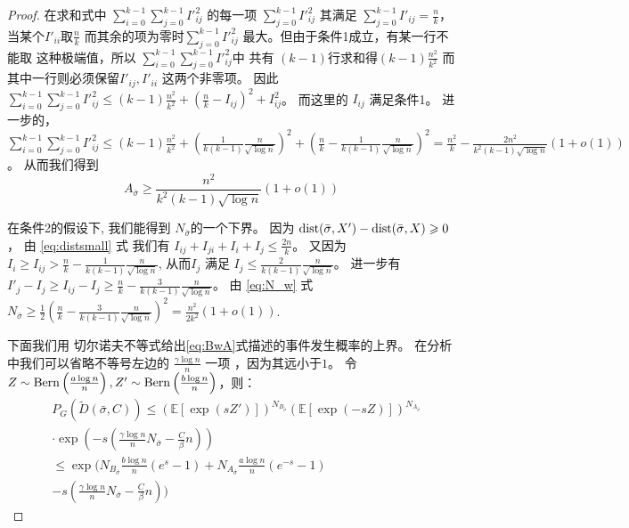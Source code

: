 \begin{proof}
    在求和式中 $\sum_{i=0}^{k-1} \sum_{j=0}^{k-1} I'^2_{ij}$
    的每一项 $\sum_{j=0}^{k-1} I'^2_{ij}$ 其满足 $\sum_{j=0}^{k-1}
    I'_{ij} = \frac{n}{k}$，当某个$I'_{ii}$取$\frac{n}{k}$
    而其余的项为零时$\sum_{j=0}^{k-1} I'^2_{ij}$
    最大。但由于条件1成立，有某一行不能取
    这种极端值，所以 $\sum_{i=0}^{k-1} \sum_{j=0}^{k-1} I'^2_{ij}$中
    共有 $(k-1)$行求和得$ (k-1)\frac{n^2}{k^2}$
    而其中一行则必须保留$I'_{ij}, I'_{ii}$ 这两个非零项。
    因此 $\sum_{i=0}^{k-1} \sum_{j=0}^{k-1} I'^2_{ij}
    \leq (k-1)\frac{n^2}{k^2} + (\frac{n}{k} - I_{ij})^2 + I^2_{ij}$。
    而这里的
    $I_{ij}$ 满足条件1。
    进一步的， $\sum_{i=0}^{k-1} \sum_{j=0}^{k-1} I'^2_{ij} \leq (k-1)\frac{n^2}{k^2} + (\frac{1}{k(k-1)}\frac{n}{\sqrt{\log n}})^2
    + (\frac{n}{k} - \frac{1}{k(k-1)}\frac{n}{\sqrt{\log n}})^2 = \frac{n^2}{k} - \frac{2n^2}{k^2 (k-1)\sqrt{\log n}}(1+o(1))$。
    从而我们得到
  \begin{equation}\label{eq:Asigma}
    A_{\bar{\sigma}} \geq \frac{n^2}{k^2 (k-1)\sqrt{\log n}}(1+o(1))
    \end{equation}
    
    
    在条件2的假设下, 我们能得到
    $N_{\bar{\sigma}}$的一个下界。
    因为
    $\operatorname{dist}(\bar{\sigma}, X') - \operatorname{dist}(\bar{\sigma}, X) \geqslant 0$，
     由 \eqref{eq:distsmall} 式 我们有
    $I_{ij} + I_{ji} + I_{i} + I_j \leq \frac{2n}{k} $。
    又因为 $I_i \geq I_{ij} > \frac{n}{k} - \frac{1}{k(k-1)}\frac{n}{\sqrt{\log n}}$,
    从而$I_j $ 满足
    $I_j \leq \frac{2}{k(k-1)}\frac{n}{\sqrt{\log n} }$。
    进一步有 $I'_j - I_j \geq I_{ij} - I_j \geq  \frac{n}{k} - \frac{3}{k(k-1)}\frac{n}{\sqrt{\log n} }$。
    由 \eqref{eq:N_w}
    式 $N_{\bar{\sigma}} \geq \frac{1}{2}(\frac{n}{k} - \frac{3}{k(k-1)}\frac{n}{\sqrt{\log n}})^2 = \frac{n^2}{2k^2}(1+o(1))$.
    
    下面我们用
     切尔诺夫不等式给出\eqref{eq:BwA}式描述的事件发生概率的上界。
     在分析中我们可以省略不等号左边的 $\frac{\gamma \log n}{n}$ 一项
     ，因为其远小于$1$。
    令 $Z \sim \operatorname{Bern}\left(\frac{a \log n}{n}\right), Z' \sim \operatorname{Bern}\left(\frac{b \log n}{n}\right)$，则：
    \begin{align*}
    &P_G(\widetilde{D}(\bar{\sigma}, C))
    \leq (\mathbb{E}[\exp(sZ')])^{N_{B_{\bar{\sigma}}}}
    (\mathbb{E}[\exp(-sZ)])^{N_{A_{\bar{\sigma}}}}\\
    &\cdot \exp(-s(\frac{\gamma \log n}{n} N_{\bar{\sigma}}  - \frac{C}{\beta}n)) \\
    & \leq \exp\Big(N_{B_{\bar{\sigma}}}
    \frac{b\log n}{n}(e^s -1) + N_{A_{\bar{\sigma}}}\frac{a\log n}{n} (e^{-s} - 1) \\
    &-s(\frac{\gamma \log n}{n} N_{\bar{\sigma}}  - \frac{C}{\beta}n)\Big) 
    \end{align*}
    

\end{proof}
